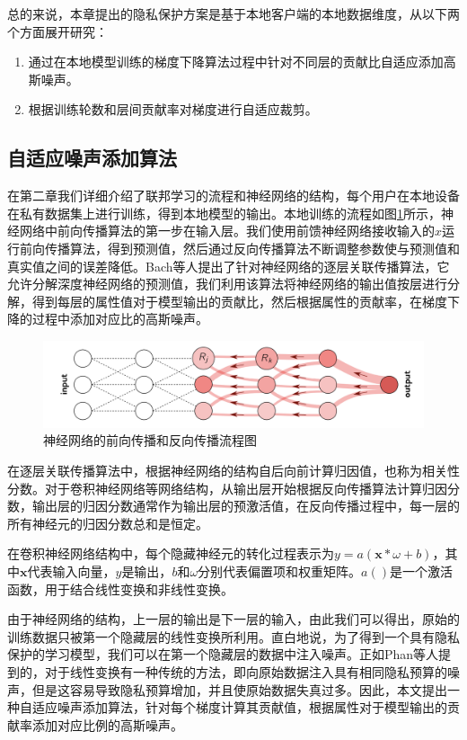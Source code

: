 总的来说，本章提出的隐私保护方案是基于本地客户端的本地数据维度，从以下两个方面展开研究：
\begin{enumerate}
\item [(1)] 通过在本地模型训练的梯度下降算法过程中针对不同层的贡献比自适应添加高斯噪声。
\item [(2)] 根据训练轮数和层间贡献率对梯度进行自适应裁剪。
\end{enumerate}

\subsection{自适应噪声添加算法}
在第二章我们详细介绍了联邦学习的流程和神经网络的结构，每个用户在本地设备在私有数据集上进行训练，得到本地模型的输出。本地训练的流程如图\ref{fig:神经网络的前向传播和反向传播流程图}所示，神经网络中前向传播算法的第一步在输入层。我们使用前馈神经网络接收输入的$x$运行前向传播算法，得到预测值，然后通过反向传播算法不断调整参数使与预测值和真实值之间的误差降低。Bach等人提出了针对神经网络的逐层关联传播算法，它允许分解深度神经网络的预测值，我们利用该算法将神经网络的输出值按层进行分解，得到每层的属性值对于模型输出的贡献比，然后根据属性的贡献率，在梯度下降的过程中添加对应比的高斯噪声。

\begin{figure}[!hbt]
\centering
	\includegraphics[scale=0.45]{fig2/C3/逐层关联传播算法}%
	\caption{神经网络的前向传播和反向传播流程图}
	\label{fig:神经网络的前向传播和反向传播流程图}	
\end{figure}

在逐层关联传播算法中，根据神经网络的结构自后向前计算归因值，也称为相关性分数。对于卷积神经网络等网络结构，从输出层开始根据反向传播算法计算归因分数，输出层的归因分数通常作为输出层的预激活值，在反向传播过程中，每一层的所有神经元的归因分数总和是恒定。

在卷积神经网络结构中，每个隐藏神经元的转化过程表示为$y=a(\mathbf{x} * \omega+b)$，其中$\mathbf{x}$代表输入向量，$y$是输出，$b$和$\omega$分别代表{}偏置项和权重矩阵。$a()$是一个激活函数，用于结合线性变换和非线性变换。

由于神经网络的结构，上一层的输出是下一层的输入，由此我们可以得出，原始的训练数据只被第一个隐藏层的线性变换所利用。直白地说，为了得到一个具有隐私保护的学习模型，我们可以在第一个隐藏层的数据中注入噪声。正如Phan等人提到的，对于线性变换有一种传统的方法，即向原始数据注入具有相同隐私预算的噪声，但是这容易导致隐私预算增加，并且使原始数据失真过多。因此，本文提出一种自适应噪声添加算法，针对每个梯度计算其贡献值，根据属性对于模型输出的贡献率添加对应比例的高斯噪声。


